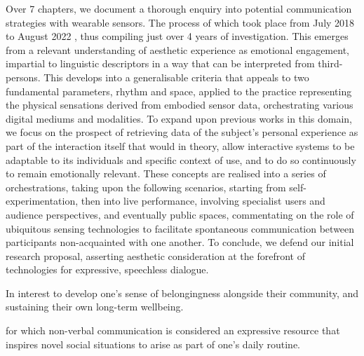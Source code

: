Over 7 chapters, we document a thorough enquiry into potential communication strategies with wearable sensors. The process of which took place from July 2018 to August 2022
, thus compiling just over 4 years of investigation. This emerges from a relevant understanding of aesthetic experience as emotional engagement, impartial to linguistic descriptors in a way that can be interpreted from third-persons. This develops into a generalisable criteria that appeals to two fundamental parameters, rhythm and space, applied to the practice representing the physical sensations derived from embodied sensor data, orchestrating various digital mediums and modalities. To expand upon previous works in this domain, we focus on the prospect of retrieving data of the subject's personal experience as part of the interaction itself that would in theory, allow interactive systems to be adaptable to its individuals and specific context of use, and to do so continuously to remain emotionally relevant. These concepts are realised into a series of orchestrations, taking upon the following scenarios, starting from self-experimentation, then into live performance, involving specialist users and audience perspectives, and eventually public spaces, commentating on the role of ubiquitous sensing technologies to facilitate spontaneous communication between participants non-acquainted with one another. To conclude, we defend our initial research proposal, asserting aesthetic consideration at the forefront of technologies for expressive, speechless dialogue.

In interest to develop one's sense of belongingness alongside their community, and sustaining their own long-term wellbeing. 

for which non-verbal communication is considered an expressive resource that inspires novel social situations to arise as part of one's daily routine.

\begin{quote}

\end{quote}